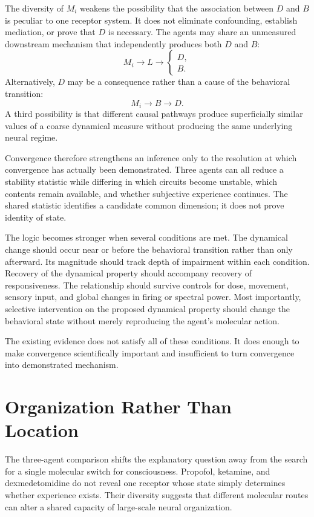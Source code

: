 \documentclass[11pt]{book}
\begin{document}
The diversity of $M_i$ weakens the possibility that the association between $D$ and $B$ is peculiar to one receptor system. It does not eliminate confounding, establish mediation, or prove that $D$ is necessary. The agents may share an unmeasured downstream mechanism that independently produces both $D$ and $B$:
\[
M_i\longrightarrow L\longrightarrow
\begin{cases}
D,\\
B.
\end{cases}
\]
Alternatively, $D$ may be a consequence rather than a cause of the behavioral transition:
\[
M_i\longrightarrow B\longrightarrow D.
\]
A third possibility is that different causal pathways produce superficially similar values of a coarse dynamical measure without producing the same underlying neural regime.

Convergence therefore strengthens an inference only to the resolution at which convergence has actually been demonstrated. Three agents can all reduce a stability statistic while differing in which circuits become unstable, which contents remain available, and whether subjective experience continues. The shared statistic identifies a candidate common dimension; it does not prove identity of state.

The logic becomes stronger when several conditions are met. The dynamical change should occur near or before the behavioral transition rather than only afterward. Its magnitude should track depth of impairment within each condition. Recovery of the dynamical property should accompany recovery of responsiveness. The relationship should survive controls for dose, movement, sensory input, and global changes in firing or spectral power. Most importantly, selective intervention on the proposed dynamical property should change the behavioral state without merely reproducing the agent's molecular action.

The existing evidence does not satisfy all of these conditions. It does enough to make convergence scientifically important and insufficient to turn convergence into demonstrated mechanism.

\section*{Organization Rather Than Location}

The three-agent comparison shifts the explanatory question away from the search for a single molecular switch for consciousness. Propofol, ketamine, and dexmedetomidine do not reveal one receptor whose state simply determines whether experience exists. Their diversity suggests that different molecular routes can alter a shared capacity of large-scale neural organization.
\end{document}

